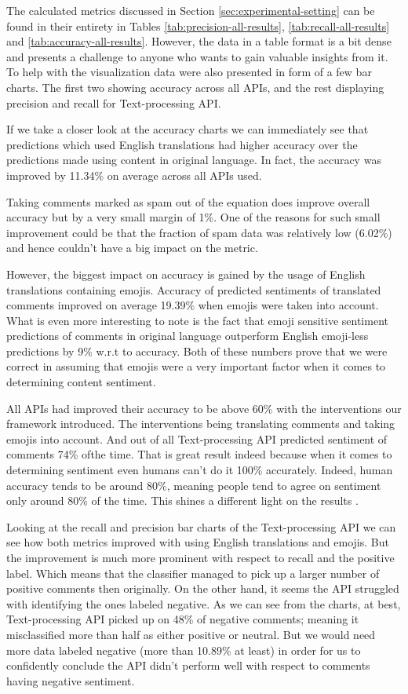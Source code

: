 The calculated metrics discussed in Section \ref{sec:experimental-setting} can be found in their entirety in Tables  \ref{tab:precision-all-results}, \ref{tab:recall-all-results} and \ref{tab:accuracy-all-results}.
However, the data in a table format is a bit dense and presents a challenge to anyone who wants to gain valuable insights from it. 
To help with the visualization data were also presented in form of a few bar charts. The first two showing accuracy across all APIs, and the rest displaying precision and recall for Text-processing API.

If we take a closer look at the accuracy charts we can immediately see that predictions which used English translations had higher accuracy over the predictions made using content in original language. 
In fact, the accuracy was improved by 11.34\% on average across all APIs used.

Taking comments marked as spam out of the equation does improve overall accuracy but by a very small margin of 1\%. 
One of the reasons for such small improvement could be that the fraction of spam data was relatively low (6.02\%) and hence couldn't have a big impact on the metric.

However, the biggest impact on accuracy is gained by the usage of English translations containing emojis.
Accuracy of predicted sentiments of translated comments improved on average 19.39\% when emojis were taken into account. 
What is even more interesting to note is the fact that emoji sensitive sentiment predictions of comments in original language outperform English emoji-less predictions by 9\% w.r.t to accuracy.
Both of these numbers prove that we were correct in assuming that emojis were a very important factor when it comes to determining content sentiment.

All APIs had improved their accuracy to be above 60\% with the interventions our framework introduced. 
The interventions being translating comments and taking emojis into account. 
And out of all Text-processing API predicted sentiment of comments 74\% ofthe time.
That is great result indeed because when it comes to determining sentiment even humans can't do it 100\% accurately. 
Indeed, human accuracy tends to be around 80\%, meaning people tend to agree on sentiment only around 80\% of the time. 
This shines a different light on the results \cite{80PercentAccuracy}. 

Looking at the recall and precision bar charts of the Text-processing API 
we can see how both metrics improved with using English translations and emojis.
But the improvement is much more prominent with respect to recall and the positive label. 
Which means that the classifier managed to pick up a larger number of positive comments then originally.
On the other hand, it seems the API struggled with identifying the ones labeled negative.
As we can see from the charts, at best, Text-processing API picked up on 48\% of negative comments; meaning it misclassified more than half as either positive or neutral.
But we would need more data labeled negative (more than 10.89\% at least) in order for us to confidently conclude the API didn't perform well with respect to comments having negative sentiment.


